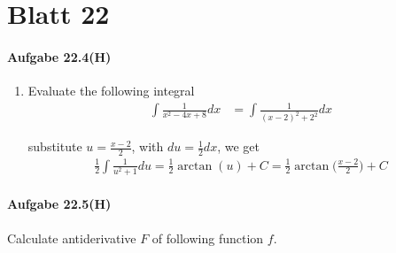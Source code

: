 \documentclass[11pt,a4paper]{article}
\begin{document}
\newpage

\section*{Blatt 22}

\newpage

\paragraph{Aufgabe 22.4(H)}

\begin{enumerate}

\item[]

Evaluate the following integral
\begin{align}
\int\frac{1}{x^2-4x+8}dx
&=
\int\frac{1}{(x-2)^2+2^2}dx
\end{align}

substitute $u=\frac{x-2}{2}$, with $du=\frac{1}{2}dx$, we get
\begin{align}
\frac{1}{2}\int\frac{1}{u^2+1}du=\frac{1}{2}\arctan(u)+C=\frac{1}{2}\arctan\bigg(\frac{x-2}{2}\bigg)+C
\end{align}

\end{enumerate}

\paragraph{Aufgabe 22.5(H)}

Calculate antiderivative $F$ of following function $f$.
\end{document}
